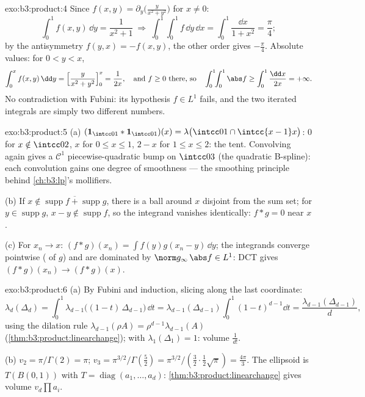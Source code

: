\begin{solution}{exo:b3:product:4}
Since $f(x,y) = \partial_y\bigl(\frac{y}{x^2+y^2}\bigr)$ for
$x \ne 0$:
\[
\int_0^1 f(x, y)\,\dd y = \frac{1}{x^2 + 1}
\ \Longrightarrow\
\int_0^1\!\!\int_0^1 f\,\dd y\,\dd x =
\int_0^1\frac{\dd x}{1 + x^2} = \frac\pi4 ;
\]
by the antisymmetry $f(y,x) = -f(x,y)$, the other order gives
$-\frac\pi4$. Absolute values: for $0 < y < x$,
\[
\int_0^x f(x,y)\,\dd y = \Bigl[\frac{y}{x^2 +
y^2}\Bigr]_0^x = \frac1{2x},
\quad\text{and } f \geq 0 \text{ there, so}\quad
\int_0^1\!\!\int_0^1\abs f \geq \int_0^1\frac{\dd x}{2x} =
+\infty .
\]
No contradiction with Fubini: its hypothesis $f \in L^1$
fails, and the two iterated integrals are simply two different
numbers.
\end{solution}

\begin{solution}{exo:b3:product:5}
(a) $(\mathbf 1_{\intcc01}*\mathbf 1_{\intcc01})(x) =
\lambda\bigl(\intcc01\cap\intcc{x-1}x\bigr)$: $0$ for $x
\notin \intcc02$, $x$ for $0 \leq x \leq 1$, $2 - x$ for $1
\leq x \leq 2$: the tent. Convolving again gives a $\mathcal
C^1$ piecewise-quadratic bump on $\intcc03$ (the quadratic
B-spline): each convolution gains one degree of smoothness ---
the smoothing principle behind \cref{ch:b3:lp}'s mollifiers.

(b) If $x \notin \overline{\operatorname{supp}f +
\operatorname{supp}g}$, there is a ball around $x$ disjoint
from the sum set; for $y \in \operatorname{supp}g$, $x - y
\notin\operatorname{supp}f$, so the integrand vanishes
identically: $f * g = 0$ near $x$.

(c) For $x_n \to x$: $(f*g)(x_n) = \int
f(y)g(x_n - y)\,\dd y$; the integrands converge pointwise
( of $g$) and are dominated by $\norm
g_\infty\,\abs f \in L^1$: DCT gives $(f*g)(x_n) \to (f*g)(x)$.
\end{solution}

\begin{solution}{exo:b3:product:6}
(a) By Fubini and induction, slicing along the last
coordinate:
\[
\lambda_d(\Delta_d) = \int_0^1
\lambda_{d-1}\bigl((1 - t)\,\Delta_{d-1}\bigr)\,\dd t
= \lambda_{d-1}(\Delta_{d-1})\int_0^1(1 - t)^{d-1}\dd t
= \frac{\lambda_{d-1}(\Delta_{d-1})}{d},
\]
using the dilation rule $\lambda_{d-1}(\rho A) =
\rho^{d-1}\lambda_{d-1}(A)$
(\cref{thm:b3:product:linearchange}); with
$\lambda_1(\Delta_1) = 1$: volume $\frac1{d!}$.

(b) $v_2 = \pi/\Gamma(2) = \pi$; $v_3 =
\pi^{3/2}/\Gamma(\frac52) = \pi^{3/2}/(\frac32\cdot\frac12
\sqrt\pi) = \frac{4\pi}3$. The ellipsoid is $T(B(0,1))$ with
$T = \operatorname{diag}(a_1, \dots, a_d)$:
\cref{thm:b3:product:linearchange} gives volume
$v_d\prod a_i$.
\end{solution}

